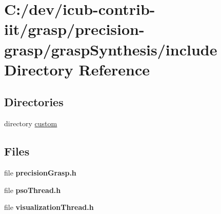\section{C\+:/dev/icub-\/contrib-\/iit/grasp/precision-\/grasp/grasp\+Synthesis/include Directory Reference}
\label{dir_2904cfe4adca6faf893553385f822bf5}
\subsection*{Directories}
\begin{DoxyCompactItemize}
\item 
directory \hyperlink{dir_5a8f847e39564767685467d4f44b81cf}{custom}
\end{DoxyCompactItemize}
\subsection*{Files}
\begin{DoxyCompactItemize}
\item 
file {\bfseries precision\+Grasp.\+h}
\item 
file {\bfseries pso\+Thread.\+h}
\item 
file {\bfseries visualization\+Thread.\+h}
\end{DoxyCompactItemize}
